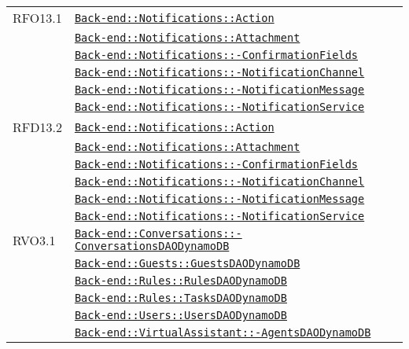 \begin{longtable}{|>{\centering}m{3cm}|m{10cm}<{\centering}|}
RFO13.1 & \hyperref[Back-end::Notifications::Action]{\texttt{Back-end::Notifications::Action}}\\
& \hyperref[Back-end::Notifications::Attachment]{\texttt{Back-end::Notifications::Attachment}}\\
& \hyperref[Back-end::Notifications::ConfirmationFields]{\texttt{Back-end::Notifications::-\linebreak ConfirmationFields}}\\
& \hyperref[Back-end::Notifications::NotificationChannel]{\texttt{Back-end::Notifications::-\linebreak NotificationChannel}}\\
& \hyperref[Back-end::Notifications::NotificationMessage]{\texttt{Back-end::Notifications::-\linebreak NotificationMessage}}\\
& \hyperref[Back-end::Notifications::NotificationService]{\texttt{Back-end::Notifications::-\linebreak NotificationService}}\\ \hline

RFD13.2 & \hyperref[Back-end::Notifications::Action]{\texttt{Back-end::Notifications::Action}}\\
& \hyperref[Back-end::Notifications::Attachment]{\texttt{Back-end::Notifications::Attachment}}\\
& \hyperref[Back-end::Notifications::ConfirmationFields]{\texttt{Back-end::Notifications::-\linebreak ConfirmationFields}}\\
& \hyperref[Back-end::Notifications::NotificationChannel]{\texttt{Back-end::Notifications::-\linebreak NotificationChannel}}\\
& \hyperref[Back-end::Notifications::NotificationMessage]{\texttt{Back-end::Notifications::-\linebreak NotificationMessage}}\\
& \hyperref[Back-end::Notifications::NotificationService]{\texttt{Back-end::Notifications::-\linebreak NotificationService}}\\ \hline

RVO3.1 & \hyperref[Back-end::Conversations::ConversationsDAODynamoDB]{\texttt{Back-end::Conversations::-\linebreak ConversationsDAODynamoDB}}\\
& \hyperref[Back-end::Guests::GuestsDAODynamoDB]{\texttt{Back-end::Guests::GuestsDAODynamoDB}}\\
& \hyperref[Back-end::Rules::RulesDAODynamoDB]{\texttt{Back-end::Rules::RulesDAODynamoDB}}\\
& \hyperref[Back-end::Rules::TasksDAODynamoDB]{\texttt{Back-end::Rules::TasksDAODynamoDB}}\\
& \hyperref[Back-end::Users::UsersDAODynamoDB]{\texttt{Back-end::Users::UsersDAODynamoDB}}\\
& \hyperref[Back-end::VirtualAssistant::AgentsDAODynamoDB]{\texttt{Back-end::VirtualAssistant::-\linebreak AgentsDAODynamoDB}}\\ \hline


\end{longtable}
